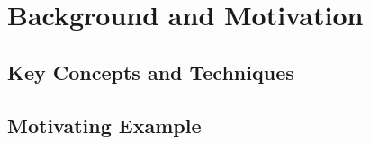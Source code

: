 \section{Background and Motivation}\label{sec:background}



\subsection{Key Concepts and Techniques}



\subsection{Motivating Example}\label{sec:motiexample}
